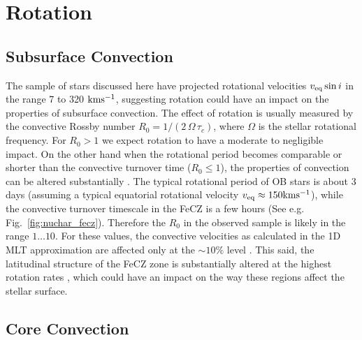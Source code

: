 \documentclass[twocolumn]{aastex63}
\begin{document}
\section{Rotation}\label{sec:rotation}
{\bf

\subsection{Subsurface Convection}
The sample of stars discussed here have projected rotational velocities $v_{\rm eq} \sin i$ in the range 7 to 320 $\rm km s^{-1}$, suggesting rotation could have an impact on the properties of subsurface convection.
The effect of rotation is usually measured by the convective Rossby number $R_0 = 1 / ( 2 \, \Omega \, \tau_c)$, where $\Omega$ is the stellar rotational frequency. For  $R_0 > 1$ we expect rotation to have a moderate to negligible impact. 
On the other hand when the rotational period becomes comparable or shorter than the convective turnover time ($R_0 \le 1$), the properties of convection can be altered substantially \citep[e.g.][]{Stevenson:1979,Augustson:2019}.   
The typical rotational period of OB stars is about 3 days (assuming a typical equatorial rotational velocity $v_{\rm eq} \approx 150 \rm km s^{-1}$), while the convective turnover timescale in the FeCZ is a few hours (See e.g. Fig.~\ref{fig:nuchar_fecz}). 
Therefore the $R_0$ in the observed sample is likely in the range $1\dots10$. For these values, the convective velocities as calculated in the 1D MLT approximation are affected only at the $\sim 10\%$ level \citep[see e.g. Fig.4 in][]{Cantiello:2009}.
This said, the latitudinal structure of the FeCZ zone is substantially altered at the highest rotation rates \citep{Maeder:2008}, which could have an impact on the way these regions affect the stellar surface. 

\subsection{Core Convection}

}
\end{document}
